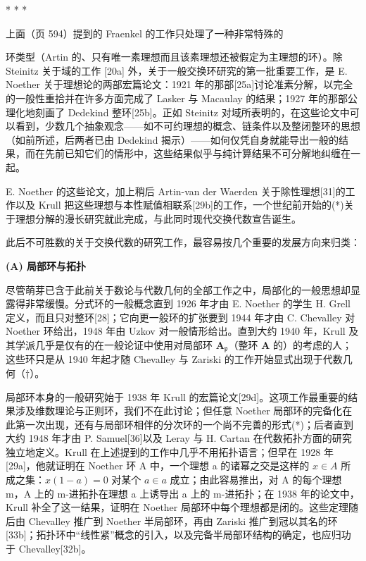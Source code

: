 \begin{center}* * *\end{center}

上面（页 594）提到的 Fraenkel 的工作只处理了一种非常特殊的

环类型（Artin 的、只有唯一素理想而且该素理想还被假定为主理想的环）。除 Steinitz 关于域的工作 {[}20a{]} 外，关于一般交换环研究的第一批重要工作，是 E. Noether 关于理想论的两部宏篇论文：1921 年的那部{[}25a{]}讨论准素分解，以完全的一般性重拾并在许多方面完成了 Lasker 与 Macaulay 的结果；1927 年的那部公理化地刻画了 Dedekind 整环{[}25b{]}。正如 Steinitz 对域所表明的，在这些论文中可以看到，少数几个抽象观念——如不可约理想的概念、链条件以及整闭整环的思想（如前所述，后两者已由 Dedekind 揭示）——如何仅凭自身就能导出一般的结果，而在先前已知它们的情形中，这些结果似乎与纯计算结果不可分解地纠缠在一起。

E. Noether 的这些论文，加上稍后 Artin-van der Waerden 关于除性理想{[}31{]}的工作以及 Krull 把这些理想与本性赋值相联系{[}29b{]}的工作，一个世纪前开始的(*)关于理想分解的漫长研究就此完成，与此同时现代交换代数宣告诞生。

此后不可胜数的关于交换代数的研究工作，最容易按几个重要的发展方向来归类：

\textbf{(A) 局部环与拓扑}\par

尽管萌芽已含于此前关于数论与代数几何的全部工作之中，局部化的一般思想却显露得非常缓慢。分式环的一般概念直到 1926 年才由 E. Noether 的学生 H. Grell 定义，而且只对整环{[}28{]}；它向更一般环的扩张要到 1944 年才由 C. Chevalley 对 Noether 环给出，1948 年由 Uzkov 对一般情形给出。直到大约 1940 年，Krull 及其学派几乎是仅有的在一般论证中使用对局部环 \(\mathbf{A}_{\mathfrak{p}}\)（整环 \(\mathbf{A}\) 的）的考虑的人；这些环只是从 1940 年起才随 Chevalley 与 Zariski 的工作开始显式出现于代数几何（†）。

局部环本身的一般研究始于 1938 年 Krull 的宏篇论文{[}29d{]}。这项工作最重要的结果涉及维数理论与正则环，我们不在此讨论；但任意 Noether 局部环的完备化在此第一次出现，还有与局部环相伴的分次环的一个尚不完善的形式(*)；后者直到大约 1948 年才由 P. Samuel{[}36{]}以及 Leray 与 H. Cartan 在代数拓扑方面的研究独立地定义。Krull 在上述提到的工作中几乎不用拓扑语言；但早在 1928 年{[}29a{]}，他就证明在 Noether 环 A 中，一个理想 a 的诸幂之交是这样的 \(x \in A\) 所成之集：\(x(1 - a) = 0\) 对某个 \(a \in a\) 成立；由此容易推出，对 A 的每个理想 m，A 上的 m-进拓扑在理想 a 上诱导出 a 上的 m-进拓扑；在 1938 年的论文中，Krull 补全了这一结果，证明在 Noether 局部环中每个理想都是闭的。这些定理随后由 Chevalley 推广到 Noether 半局部环，再由 Zariski 推广到冠以其名的环{[}33b{]}；拓扑环中“线性紧”概念的引入，以及完备半局部环结构的确定，也应归功于 Chevalley{[}32b{]}。

